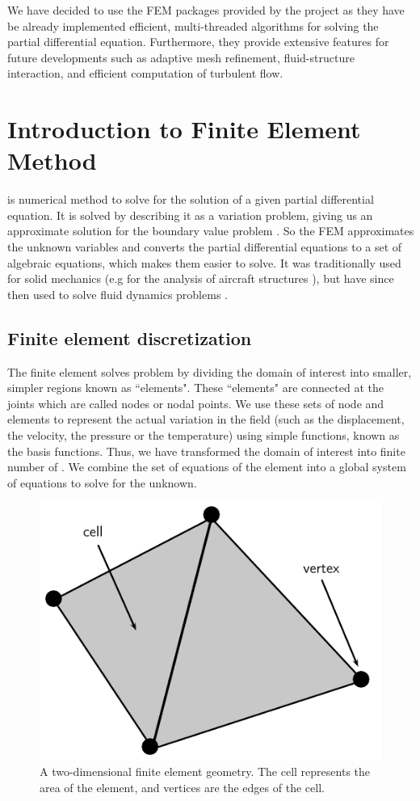 We have decided to use the FEM packages provided by the \fenics project as they have be already implemented efficient, multi-threaded algorithms for solving the partial differential equation. Furthermore, they provide extensive features for future developments such as adaptive mesh refinement, fluid-structure interaction, and efficient computation of turbulent flow.

\section{Introduction to Finite Element Method}

 is numerical method to solve for the solution of a given partial differential equation. It is solved by describing it as a variation problem, giving us an approximate solution for the boundary value problem \cite{Brenner2002}. So the FEM approximates the unknown variables and converts the partial differential equations to a set of algebraic equations, which makes them easier to solve. It was traditionally used for solid mechanics (e.g for the analysis of aircraft structures \cite{RAO2011}), but have since then used to solve fluid dynamics problems \cite{Guermond2006a} \cite{Johnston2004a} \cite{Guermond2003a}.

\subsection*{Finite element discretization}

The finite element solves problem by dividing the domain of interest into smaller, simpler regions known as ``elements". These ``elements" are connected at the joints which are called nodes or nodal points. We use these sets of node and elements to represent the actual variation in the field (such as the displacement, the velocity, the pressure or the temperature) using simple functions, known as the basis functions. Thus, we have transformed the domain of interest into finite number of . We combine the set of equations of the element into a global system of equations to solve for the unknown.

	\begin{figure}[b]
	\centering
	\includegraphics[width=0.4\linewidth]{./figures/eulerian/finiteElementDefinitions.pdf}
	\caption{A two-dimensional finite element geometry. The cell represents the area of the element, and vertices are the edges of the cell.}
	\label{fig:finiteElementDefinitions}
	\end{figure}

